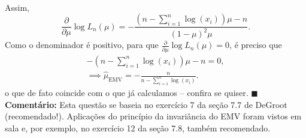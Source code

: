 {\begin{align*}
\end{align*}
Assim,
\begin{equation*}
    \frac{\partial}{\partial \mu}\log L_n(\mu) = -\dfrac{\left(n-\sum_{i=1}^n \log(x_i)\right)\mu-n}{\left(1-\mu\right)^2\mu}.
\end{equation*}
Como o denominador é positivo, para que $\frac{\partial}{\partial \mu}\log L_n(\mu) = 0$, é preciso que 
\begin{align*}
    -\left(n-\sum_{i=1}^n \log(x_i)\right)\mu-n = 0,\\
    \implies \hat{\mu}_{\textrm{EMV}} = -\frac{n}{n-\sum_{i=1}^n \log(x_i)}.
\end{align*}
o que de fato coincide com o que já calculamos -- confira se quiser.
$\blacksquare$\\
\textbf{Comentário:}
Esta questão se baseia no exercício 7 da seção 7.7 de DeGroot (recomendado!).
Aplicações do princípio da invariância do EMV foram vistos em sala e, por exemplo, no exercício 12 da seção 7.8, também recomendado.
}